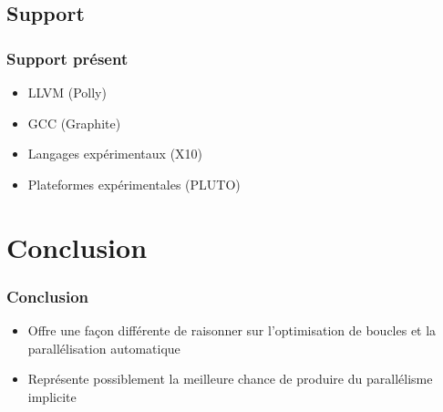 \documentclass{beamer}
\begin{document}
\subsection{Support}
\begin{frame}
\frametitle{Support présent}
\begin{itemize}
\item LLVM (Polly)
\item GCC (Graphite)
\item Langages expérimentaux (X10)
\item Plateformes expérimentales (PLUTO)
\end{itemize}
\end{frame}

\section{Conclusion}
\begin{frame}
\frametitle{Conclusion}
\begin{itemize}
\item Offre une façon différente de raisonner sur l'optimisation de boucles et la parallélisation automatique
\item Représente possiblement la meilleure chance de produire du parallélisme implicite
\end{itemize}
\end{frame}
\end{document}
